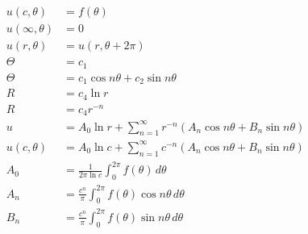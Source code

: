 \documentclass{article}
\begin{document}
\begin{align*}
  u(c, \theta)      & = f(\theta)                                                                      \\
  u(\infty, \theta) & = 0                                                                              \\
  u(r, \theta)      & = u(r, \theta + 2 \pi)                                                           \\
  \Theta            & = c_1                                                                            \\
  \Theta            & = c_1 \cos n \theta + c_2 \sin n \theta                                          \\
  R                 & = c_4 \ln r                                                                      \\
  R                 & = c_4 r^{-n}                                                                     \\
  u                 & = A_0 \ln r + \sum_{n = 1}^\infty r^{-n} (A_n \cos n \theta + B_n \sin n \theta) \\
  u(c, \theta)      & = A_0 \ln c + \sum_{n = 1}^\infty c^{-n} (A_n \cos n \theta + B_n \sin n \theta) \\
  A_0               & = \frac{1}{2 \pi \ln c} \int_0^{2 \pi} f(\theta) \,d \theta                      \\
  A_n               & = \frac{c^n}{\pi} \int_0^{2 \pi} f(\theta) \cos n \theta \,d \theta              \\
  B_n               & = \frac{c^n}{\pi} \int_0^{2 \pi} f(\theta) \sin n \theta \,d \theta
\end{align*}
\end{document}
